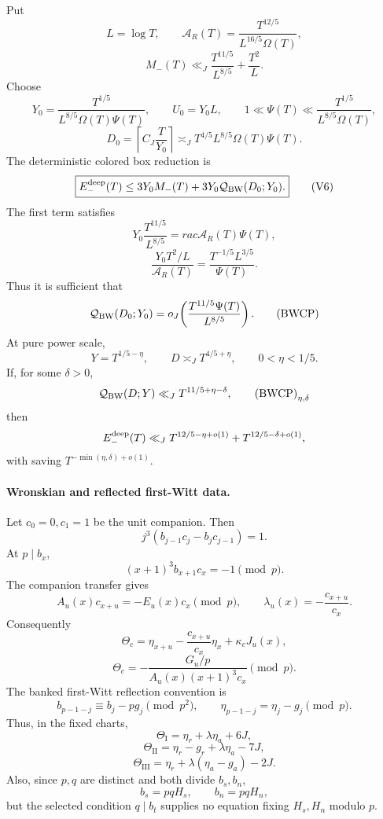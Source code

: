 \documentclass{article}
\begin{document}
Put
\[
 L=\log T,\qquad
 \mathcal A_R(T)=\frac{T^{12/5}}{L^{16/5}\Omega(T)},
\]
\[
 M_-(T)\ll_J\frac{T^{11/5}}{L^{8/5}}+\frac{T^2}{L}.
\]
Choose
\[
 Y_0=\frac{T^{1/5}}{L^{8/5}\Omega(T)\Psi(T)},\qquad
 U_0=Y_0L,\qquad
 1\ll\Psi(T)\ll\frac{T^{1/5}}{L^{8/5}\Omega(T)},
\]
\[
 D_0=\left\lceil C_J\frac{T}{Y_0}\right\rceil
 \asymp_JT^{4/5}L^{8/5}\Omega(T)\Psi(T).
\]
The deterministic colored box reduction is
\[
 \boxed{E_-^{\rm deep}(T)
 \le3Y_0M_-(T)+3Y_0\mathcal Q_{\rm BW}(D_0;Y_0).}
 \tag{V6}
\]
The first term satisfies
\[
 Y_0\frac{T^{11/5}}{L^{8/5}}=rac{\mathcal A_R(T)}{\Psi(T)},
\]
\[
 \frac{Y_0T^2/L}{\mathcal A_R(T)}
 =\frac{T^{-1/5}L^{3/5}}{\Psi(T)}.
\]
Thus it is sufficient that
\[
 \mathcal Q_{\rm BW}(D_0;Y_0)
 =o_J\!\left(\frac{T^{11/5}\Psi(T)}{L^{8/5}}\right).
 \tag{BWCP}
\]
At pure power scale,
\[
 Y=T^{1/5-\eta},\qquad D\asymp_JT^{4/5+\eta},\qquad0<\eta<1/5.
\]
If, for some $\delta>0$,
\[
 \mathcal Q_{\rm BW}(D;Y)\ll_JT^{11/5+\eta-\delta},
 \tag{BWCP}_{\eta,\delta}
\]
then
\[
 E_-^{\rm deep}(T)
 \ll_JT^{12/5-\eta+o(1)}+T^{12/5-\delta+o(1)},
\]
with saving $T^{-\min(\eta,\delta)+o(1)}$.

\paragraph{Wronskian and reflected first-Witt data.}
Let $c_0=0,c_1=1$ be the unit companion.  Then
\[
 j^3(b_{j-1}c_j-b_jc_{j-1})=1.
\]
At $p\mid b_x$,
\[
 (x+1)^3b_{x+1}c_x=-1\pmod p.
\]
The companion transfer gives
\[
 A_u(x)c_{x+u}=-E_u(x)c_x\pmod p,
 \qquad
 \lambda_u(x)=-\frac{c_{x+u}}{c_x}.
\]
Consequently
\[
 \Theta_c=\eta_{x+u}-\frac{c_{x+u}}{c_x}\eta_x+\kappa_cJ_u(x),
\]
\[
 \Theta_c=-\frac{G_u/p}{A_u(x)(x+1)^3c_x}\pmod p.
\]
The banked first-Witt reflection convention is
\[
 b_{p-1-j}\equiv b_j-pg_j\pmod{p^2},
 \qquad
 \eta_{p-1-j}=\eta_j-g_j\pmod p.
\]
Thus, in the fixed charts,
\[
 \Theta_{\mathrm I}=\eta_r+\lambda\eta_a+6J,
\]
\[
 \Theta_{\mathrm {II}}=\eta_r-g_r+\lambda\eta_a-7J,
\]
\[
 \Theta_{\mathrm {III}}=\eta_r+\lambda(\eta_a-g_a)-2J.
\]
Also, since $p,q$ are distinct and both divide $b_s,b_n$,
\[
 b_s=pqH_s,\qquad b_n=pqH_n,
\]
but the selected condition $q\mid b_t$ supplies no equation fixing
$H_s,H_n$ modulo $p$.
\end{document}
